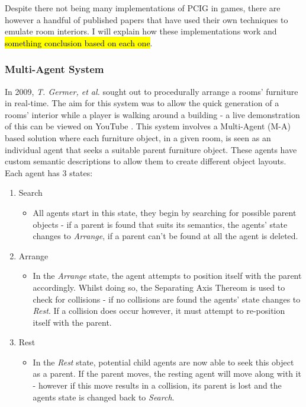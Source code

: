 \bigskip
Despite there not being many implementations of PCIG in games, there are however a handful of published papers that have used their own techniques to emulate room interiors. I will explain how these implementations work and \hl{something conclusion based on each one}.

\bigskip
\subsubsection{Multi-Agent System}
In 2009, \textit{T. Germer, et al.} \cite{real-time-walkthroughs} sought out to procedurally arrange a rooms' furniture in real-time. 
The aim for this system was to allow the quick generation of a rooms' interior while a player is walking around a building - a live demonstration of this can be viewed on YouTube \cite{youtube:real-time-walkthroughs}.
This system involves a Multi-Agent (M-A) based solution where each furniture object, in a given room, is seen as an individual agent that seeks a suitable parent furniture object. These agents have custom semantic descriptions to allow them to create different object layouts. %
Each agent has 3 states:
\begin{enumerate}
    \item Search
        \begin{itemize}
            \item All agents start in this state, they begin by searching for possible parent objects - if a parent is found that suits its semantics, the agents' state changes to \textit{Arrange}, if a parent can't be found at all the agent is deleted.
        \end{itemize}
    \item Arrange
        \begin{itemize}
            \item In the \textit{Arrange} state, the agent attempts to position itself with the parent accordingly. Whilst doing so, the Separating Axis Thereom \cite{separating-axis-thereom} is used to check for collisions - if no collisions are found the agents' state changes to \textit{Rest}. If a collision does occur however, it must attempt to re-position itself with the parent.
        \end{itemize}
    \item Rest
        \begin{itemize}
            \item In the \textit{Rest} state, potential child agents are now able to seek this object as a parent. If the parent moves, the resting agent will move along with it - however if this move results in a collision, its parent is lost and the agents state is changed back to \textit{Search}.
        \end{itemize}
\end{enumerate}
